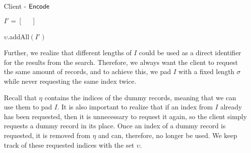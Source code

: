 \begin{algorithm}[H]
    \LinesNumbered
    \caption{Client - $ \mathsf{{Encode}} $}
    \label{algo:Encode}

    \vspace*{0.48cm}

    $ I' = \left[ \phantom{=} \right] $



    $ \upsilon $.addAll$ \left( I' \right) $

    \vspace*{0.48cm}

\end{algorithm}

\clearpage

Further, we realize that different lengths of $ I $ could be used as a direct identifier for the results from the search. Therefore, we always want the client to request the same amount of records, and to achieve this, we pad $ I $ with a fixed length $ \sigma $ while never requesting the same index twice. 

Recall that $ \eta $ contains the indices of the dummy records, meaning that we can use them to pad $ I $. It is also important to realize that if an index from $ I $ already has been requested, then it is unnecessary to request it again, so the client simply requests a dummy record in its place. Once an index of a dummy record is requested, it is removed from $ \eta $ and can, therefore, no longer be used. We keep track of these requested indices with the set $ \upsilon $.
\raggedbottom

